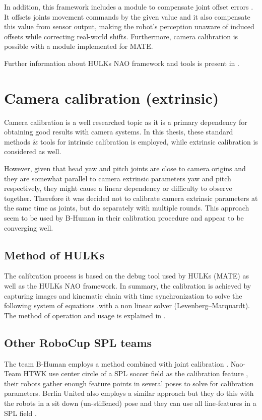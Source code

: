 \documentclass[english, printversion, nomenclature, notitle]{tuvisionthesis} %
\makeatletter
\renewcommand{\todo}[2][]{\tikzexternaldisable\@todo[#1]{#2}\tikzexternalenable}
\makeatother
\begin{document}
In addition, this framework includes a module to compensate joint offset errors \todo{cite Code release?}. It offsets joints movement commands by the given value and it also compensate this value from sensor output, making the robot's perception unaware of induced offsets while correcting real-world shifts. Furthermore, camera calibration is possible with a module implemented for MATE.

Further information about HULKs NAO framework and tools is present in \cite{darshana_adikari_team_2017}.

\section{Camera calibration (extrinsic)}

Camera calibration is a well researched topic as it is a primary dependency for obtaining good results with camera systems. In this thesis, these standard methods \& tools for intrinsic calibration is employed, while extrinsic calibration is considered as well.

However, given that head yaw and pitch joints are close to camera origins and they are somewhat parallel to camera extrinsic parameters yaw and pitch respectively, they might cause a linear dependency or difficulty to observe together. Therefore it was decided not to calibrate camera extrinsic parameters at the same time as joints, but do separately with multiple rounds. This approach seem to be used by B-Human in their calibration procedure \cite{thomas_rofer_b-human_2018} and appear to be converging well.

\subsection{Method of HULKs}

The calibration process is based on the debug tool used by HULKs (MATE) as well as the HULKs NAO framework. In summary, the calibration is achieved by capturing images and kinematic chain with time synchronization to solve the following system of equations .with a non linear solver (Levenberg–Marquardt). The method of operation and usage is explained in \cite{darshana_adikari_team_2017}.

\subsection{Other RoboCup SPL teams}
\label{subsec:other_extrinsic_calib}
The team B-Human employs a method combined with joint calibration \cite{thomas_rofer_b-human_2018}. Nao-Team HTWK use center circle of a SPL soccer field as the calibration feature \cite{rico_tilgner_nto-team_2019}, their robots gather enough feature points in several poses to solve for calibration parameters. Berlin United also employs a similar approach but they do this with the robots in a sit down (un-stiffened) pose and they can use all line-features in a SPL field \cite{Berlin_United_TRR}.
\end{document}
